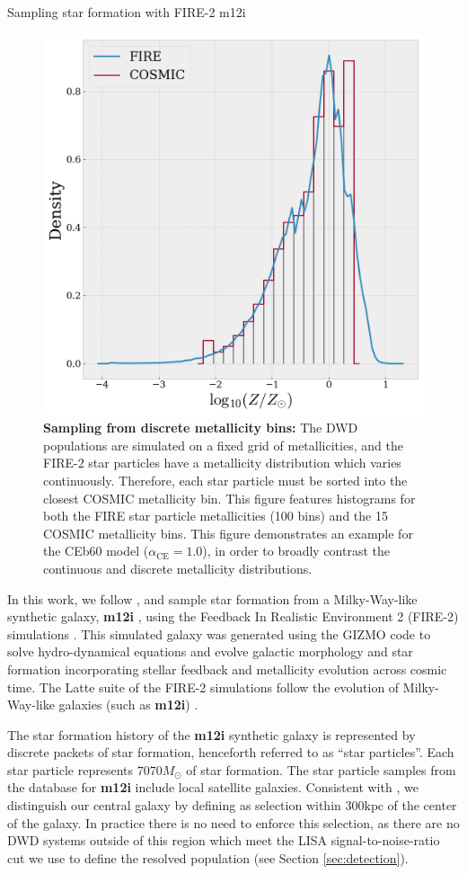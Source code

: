 \documentclass[twocolumn]{aastex631}
\newcommand*{\alphaCE}{\alpha_{\mathrm{CE}}}
\newcommand*{\msun}{M_{\odot}}
\begin{document}
\begin{subsection}{Sampling star formation with FIRE-2 m12i}
\begin{figure}
\centering
\includegraphics[width=3.375 in]{CEb60_m12i_ZZ.png}
\caption{\label{fig:metmet}
    \textbf{Sampling from discrete metallicity bins:}
The DWD populations are simulated on a fixed grid of metallicities, 
        and the FIRE-2 star particles have a 
        metallicity distribution which varies continuously.
    Therefore, each star particle must be sorted into the closest COSMIC
        metallicity bin.
    This figure features histograms for both the FIRE star particle metallicities
        (100 bins) and the 15 COSMIC metallicity bins.
    This figure demonstrates an example for the CEb60 model 
        ($\alphaCE = 1.0$),
        in order to broadly contrast the continuous and discrete
        metallicity distributions.
}
\end{figure}
In this work, we follow \citet{Thiele2023}, and sample
    star formation from a Milky-Way-like synthetic galaxy,
    \textbf{m12i} \citep{Wetzel2016}, using the Feedback In Realistic Environment 2
    (FIRE-2) simulations
    \citep{Hopkins2014,Hopkins2015,Hopkins2018}.
This simulated galaxy was generated using the GIZMO code \citep{Hopkins2015}
    to solve hydro-dynamical equations and evolve galactic morphology
    and star formation incorporating stellar feedback and metallicity evolution across cosmic time.
The Latte suite of the FIRE-2 simulations
    follow the evolution of Milky-Way-like galaxies (such as \textbf{m12i})
    \citep{Wetzel2016, Garrison-Kimmel2017, Sanderson2020}.

The star formation history of the \textbf{m12i} synthetic galaxy is represented
    by discrete packets of star formation, henceforth referred to as ``star particles''.
Each star particle represents $7070 \msun$ of star formation.
The star particle samples from the database for \textbf{m12i} include
    local satellite galaxies.
Consistent with \citet{Lamberts2019}, we distinguish our central galaxy by defining
    as selection within $300 \mathrm{kpc}$ of the center of the galaxy.
In practice there is no need to enforce this selection,
    as there are no DWD systems outside of this region which meet
    the LISA signal-to-noise-ratio cut we use to define the resolved population
    (see Section \ref{sec:detection}).


\end{subsection}
\end{document}
